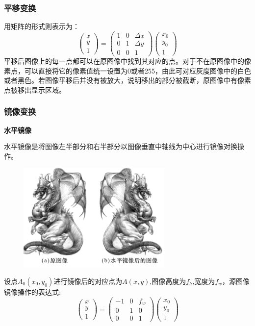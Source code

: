 \documentclass[11pt]{article}
\begin{document}
\subsubsection{平移变换}
用矩阵的形式则表示为：
$$\begin{pmatrix}x \\y \\1 \end{pmatrix}=\begin{pmatrix}1 & 0 & \Delta x \\ 0 & 1 &\Delta y\\ 0 & 0 & 1\end{pmatrix}\begin{pmatrix}x_0 \\ y_0 \\ 1\end{pmatrix}$$
平移后图像上的每一点都可以在原图像中找到其对应的点。对于不在原图像中的像素点，可以直接将它的像素值统一设置为0或者255，由此可对应灰度图像中的白色或者黑色。若图像平移后并没有被放大，说明移出的部分被截断，原图像中有像素点被移出显示区域。

\subsubsection{镜像变换}
\textbf{水平镜像}

水平镜像是将图像左半部分和右半部分以图像垂直中轴线为中心进行镜像对换操作。
\begin{figure}
	\centering
	\includegraphics[width=0.23\textheight]{14}
\end{figure}

设点$A_0(x_0,y_0)$进行镜像后的对应点为$A(x,y)$,图像高度为$f_h$,宽度为$f_w$，源图像镜像操作的表达式:
$$\begin{pmatrix}x \\y \\1 \end{pmatrix}=\begin{pmatrix}-1 & 0 & f_w \\ 0 & 1 & 0\\ 0 & 0 & 1\end{pmatrix}\begin{pmatrix}x_0 \\ y_0 \\ 1\end{pmatrix}$$
\end{document}
